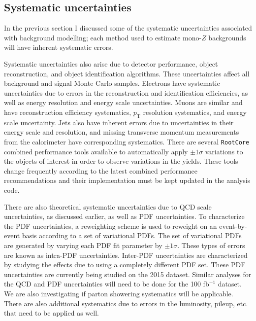 \subsection{Systematic uncertainties}
\label{sec:syst}

In the previous section I discussed some of the systematic uncertainties associated with background modelling; each method used to estimate mono-$Z$ backgrounds will have inherent systematic errors. 

Systematic uncertainties also arise due to detector performance, object reconstruction, and object identification algorithms. These uncertainties affect all background and signal Monte Carlo samples. Electrons have systematic uncertainties due to errors in the reconstruction and identification efficiencies, as well as energy resolution and energy scale uncertainties. Muons are similar and have reconstruction efficiency systematics, $p_\text{T}$ resolution systematics, and energy scale uncertainty. Jets also have inherent errors due to uncertainties in their energy scale and resolution, and missing transverse momentum measurements from the calorimeter have corresponding systematics. There are several \texttt{RootCore} combined performance tools available to automatically apply $\pm 1 \sigma$ variations to the objects of interest in order to observe variations in the yields. These tools change frequently according to the latest combined performance recommendations and their implementation must be kept updated in the analysis code.

There are also theoretical systematic uncertainties due to QCD scale uncertainties, as discussed earlier, as well as PDF uncertainties. To characterize the PDF uncertainties, a reweighting scheme is used to reweight on an event-by-event basis according to a set of variational PDFs. The set of variational PDFs are generated by varying each PDF fit parameter by $\pm 1\sigma$. These types of errors are known as intra-PDF uncertainties. Inter-PDF uncertainties are characterized by studying the effects due to using a completely different PDF set. These PDF uncertainties are currently being studied on the 2015 dataset. Similar analyses for the QCD and PDF uncertainties will need to be done for the 100 fb$^{-1}$ dataset. We are also investigating if parton showering systematics will be applicable. There are also additional systematics due to errors in the luminosity, pileup, etc. that need to be applied as well. 